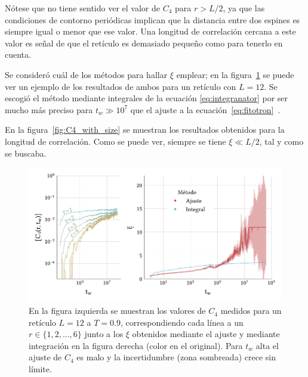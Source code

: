 \documentclass[11pt]{report}
\begin{document}
Nótese que no tiene sentido ver el valor de $C_4$ para $r>L/2$, ya que
las condiciones de contorno periódicas implican que la distancia entre
dos espines es siempre igual o menor que ese valor. Una longitud de
correlación cercana a este valor es señal de que el retículo es
demasiado pequeño como para tenerlo en cuenta.

Se consideró cuál de los métodos para hallar $ξ$ emplear; en la
figura~\ref{fig:c4} se puede ver un ejemplo de los resultados de ambos
para un retículo con $L=12$. Se escogió el método mediante integrales
de la ecuación \eqref{eq:integranator} por ser mucho más preciso para
$t_w≫10^7$ que el ajuste a la ecuación~\ref{eq:fitotron}~\cite{c4integration}.

En la figura~\ref{fig:C4_with_size} se muestran los resultados
obtenidos para la longitud de correlación. Como se puede ver, siempre se
tiene $ξ ≪ L/2$, tal y como se buscaba.


\begin{figure}[!h]
  \centering
  \includegraphics{../study_cases/c4_functional_dependence/C4_handedit.pdf}
  \caption{En la figura izquierda se muestran los valores de $C_4$
    medidos para un retículo $L=12$ a $T=0.9$, correspondiendo cada
    línea a un $r∈\{1,2,\ldots,6\}$ junto a los $ξ$ obtenidos mediante
    el ajuste y mediante integración en la figura derecha (color en el
    original). Para $t_w$ alta el ajuste de $C_4$ es malo y la
    incertidumbre (zona sombreada) crece sin límite.}
  \label{fig:c4}
\end{figure}
\end{document}
